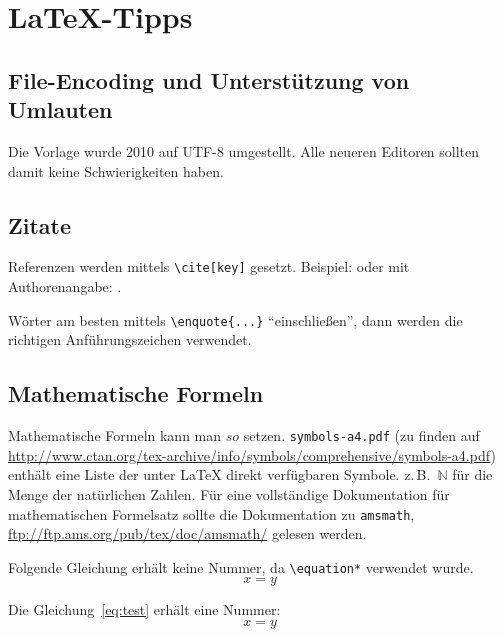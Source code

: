 \chapter{LaTeX-Tipps}
\label{chap:latextipps}

\section{File-Encoding und Unterstützung von Umlauten}
Die Vorlage wurde 2010 auf UTF-8 umgestellt.
Alle neueren Editoren sollten damit keine Schwierigkeiten haben.

\section{Zitate}
Referenzen werden mittels \texttt{\textbackslash cite[key]} gesetzt.
Beispiel: \cite{WSPA} oder mit Authorenangabe: \citet{WSPA}.

Wörter am besten mittels \texttt{\textbackslash enquote\{...\}} \enquote{einschließen}, dann werden die richtigen Anführungszeichen verwendet.

\section{Mathematische Formeln}
\label{sec:mf}
Mathematische Formeln kann man $so$ setzen. \texttt{symbols-a4.pdf} (zu finden auf \url{http://www.ctan.org/tex-archive/info/symbols/comprehensive/symbols-a4.pdf}) enthält eine Liste der unter LaTeX direkt verfügbaren Symbole. z.\,B.\ $\mathbb{N}$ für die Menge der natürlichen Zahlen. Für eine vollständige Dokumentation für mathematischen Formelsatz sollte die Dokumentation zu \texttt{amsmath}, \url{ftp://ftp.ams.org/pub/tex/doc/amsmath/} gelesen werden.

Folgende Gleichung erhält keine Nummer, da \texttt{\textbackslash equation*} verwendet wurde.
\begin{equation*}
x = y
\end{equation*}

Die Gleichung~\ref{eq:test} erhält eine Nummer:
\begin{equation}
\label{eq:test}
x = y
\end{equation}

